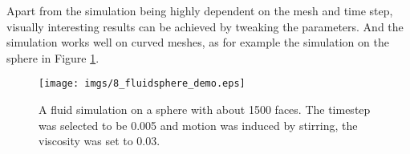 Apart from the simulation being highly dependent on the mesh and time step, visually interesting results can be achieved by tweaking the parameters. And the simulation works well on curved meshes, as for example the simulation on the sphere in Figure \ref{fig:fd_sphere}.

\begin{figure}%
\texttt{[image: imgs/8\_fluidsphere\_demo.eps]}%
\caption{A fluid simulation on a sphere with about 1500 faces. The timestep was selected to be 0.005 and motion was induced by stirring, the viscosity was set to 0.03. }%
\label{fig:fd_sphere}%
\end{figure}


